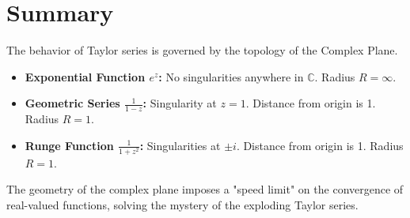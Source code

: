 \documentclass[11pt, letterpaper]{article}
\theoremstyle{definition}
\theoremstyle{remark}
\newcommand{\C}{\mathbb{C}}
\begin{document}
\section{Summary}

The behavior of Taylor series is governed by the topology of the Complex Plane.
\begin{itemize}
    \item \textbf{Exponential Function $e^z$:} No singularities anywhere in $\C$. Radius $R = \infty$.
    \item \textbf{Geometric Series $\frac{1}{1-z}$:} Singularity at $z=1$. Distance from origin is 1. Radius $R=1$.
    \item \textbf{Runge Function $\frac{1}{1+z^2}$:} Singularities at $\pm i$. Distance from origin is 1. Radius $R=1$.
\end{itemize}

The geometry of the complex plane imposes a "speed limit" on the convergence of real-valued functions, solving the mystery of the exploding Taylor series.
\end{document}
